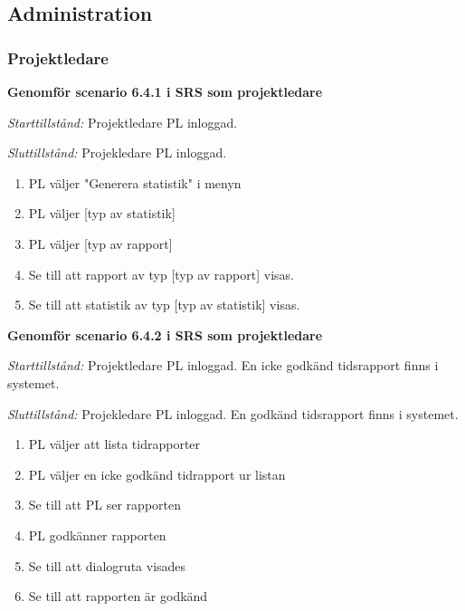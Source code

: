 \documentclass[a4paper]{article}
\begin{document}
\begin{ST}
\begin{enumerate}
\end{enumerate}

\end{ST}




\subsection{Administration}

\subsubsection{Projektledare}
\begin{ST}

\item
\textbf{Genomför scenario 6.4.1 i SRS som projektledare}

\emph{Starttillstånd:} Projektledare PL inloggad.

\emph{Sluttillstånd:} Projekledare PL inloggad.

\begin{enumerate}
\item
PL väljer "Generera statistik" i menyn
\item
PL väljer [typ av statistik]
\item 
PL väljer [typ av rapport]
\item
Se till att rapport av typ [typ av rapport] visas.
\item
Se till att statistik av typ [typ av statistik] visas.
\end{enumerate}

\item
\textbf{Genomför scenario 6.4.2 i SRS som projektledare}

\emph{Starttillstånd:} Projektledare PL inloggad. En icke godkänd tidsrapport finns i systemet.

\emph{Sluttillstånd:} Projekledare PL inloggad. En godkänd tidsrapport finns i systemet.

\begin{enumerate}

\item
PL väljer att lista tidrapporter
\item
PL väljer en icke godkänd tidrapport ur listan
\item
Se till att PL ser rapporten
\item
PL godkänner rapporten
\item
Se till att dialogruta visades
\item
Se till att rapporten är godkänd


\end{enumerate}
\end{ST}
\end{document}
